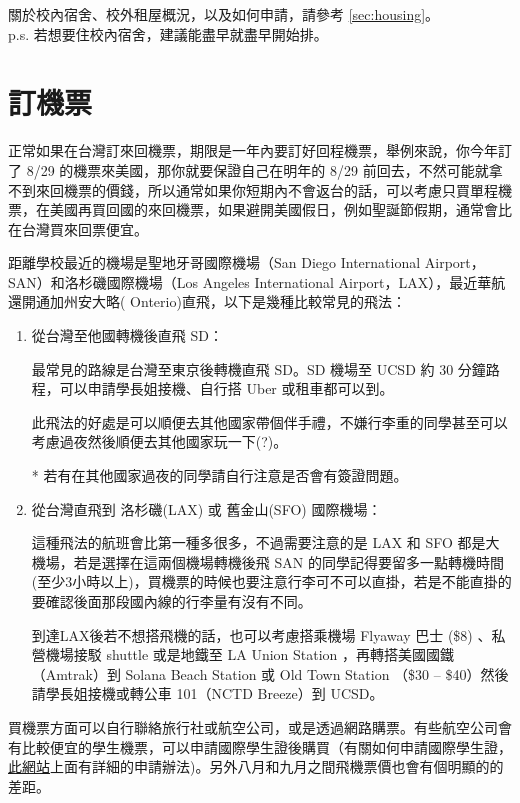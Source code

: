 \documentclass[10pt,a4paper]{book}
\begin{document}
\begin{CJK}{UTF8}{bkai}
關於校內宿舍、校外租屋概況，以及如何申請，請參考 \ref{sec:housing}。\\
p.s. 若想要住校內宿舍，建議能盡早就盡早開始排。

\section{訂機票}

正常如果在台灣訂來回機票，期限是一年內要訂好回程機票，舉例來說，你今年訂了 8/29 的機票來美國，那你就要保證自己在明年的 8/29 前回去，不然可能就拿不到來回機票的價錢，所以通常如果你短期內不會返台的話，可以考慮只買單程機票，在美國再買回國的來回機票，如果避開美國假日，例如聖誕節假期，通常會比在台灣買來回票便宜。

距離學校最近的機場是聖地牙哥國際機場（San Diego International Airport，SAN）和洛杉磯國際機場（Los Angeles International Airport，LAX），最近華航還開通加州安大略( Onterio)直飛，以下是幾種比較常見的飛法：

\begin{enumerate}
\item 從台灣至他國轉機後直飛 SD：

最常見的路線是台灣至東京後轉機直飛 SD。SD 機場至 UCSD 約 30 分鐘路程，可以申請學長姐接機、自行搭 Uber 或租車都可以到。

此飛法的好處是可以順便去其他國家帶個伴手禮，不嫌行李重的同學甚至可以考慮過夜然後順便去其他國家玩一下(?)。

* 若有在其他國家過夜的同學請自行注意是否會有簽證問題。

\item 從台灣直飛到 洛杉磯(LAX) 或 舊金山(SFO) 國際機場：

這種飛法的航班會比第一種多很多，不過需要注意的是 LAX 和 SFO 都是大機場，若是選擇在這兩個機場轉機後飛 SAN 的同學記得要留多一點轉機時間(至少3小時以上)，買機票的時候也要注意行李可不可以直掛，若是不能直掛的要確認後面那段國內線的行李量有沒有不同。

到達LAX後若不想搭飛機的話，也可以考慮搭乘機場 Flyaway 巴士 (\$8) 、私營機場接駁 shuttle 或是地鐵至 LA Union Station ，再轉搭美國國鐵（Amtrak）到 Solana Beach Station 或 Old Town Station （\$30 -- \$40）然後請學長姐接機或轉公車 101（NCTD Breeze）到 UCSD。

\end{enumerate}

買機票方面可以自行聯絡旅行社或航空公司，或是透過網路購票。有些航空公司會有比較便宜的學生機票，可以申請國際學生證後購買（有關如何申請國際學生證，\href{https://www.isic.hk/home/apply/isic}{此網站}上面有詳細的申請辦法)。另外八月和九月之間飛機票價也會有個明顯的的差距。




\end{CJK}
\end{document}
